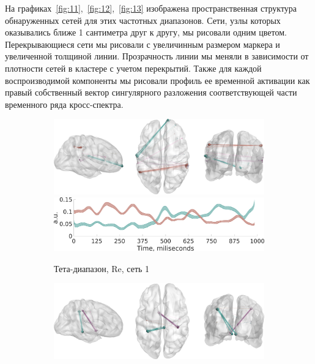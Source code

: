  На графиках~\ref{fig:11},~\ref{fig:12},~\ref{fig:13} изображена пространственная
структура обнаруженных сетей для этих частотных диапазонов. Сети, узлы которых
оказывались ближе 1 сантиметра друг к другу, мы рисовали одним цветом. Перекрывающиеся сети
мы рисовали с увеличинным размером маркера и увеличенной толщиной линии. Прозрачность
линии мы меняли в зависимости от плотности сетей в кластере с учетом перекрытий.
Также для каждой воспроизводимой компоненты мы рисовали профиль ее временной активации
как правый собственный вектор сингулярного разложения соответствующей части временного
ряда кросс-спектра.

\begin{figure}
\centering
{}

 \begin{subfigure}[b]{0.4\textwidth}
 \includegraphics[width=\textwidth]{../images/psiicos_paper/Figure11_a1.jpg}
 \includegraphics[width=\textwidth]{../images/psiicos_paper/Figure11_a2.jpg}
 \caption{Тета-диапазон, Re, сеть 1}\label{fig:11a}
 \end{subfigure}
 \hspace{1cm}
 \begin{subfigure}[b]{0.4\textwidth}
 \includegraphics[width=\textwidth]{../images/psiicos_paper/Figure11_b1.jpg}

\end{subfigure}
\end{figure}
